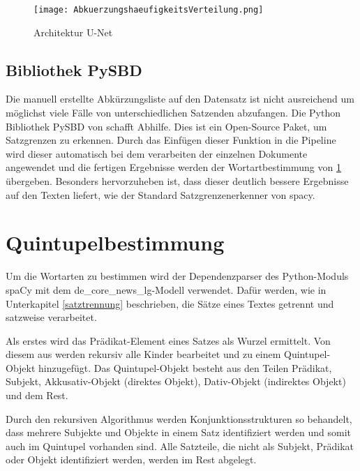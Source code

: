 \begin{figure}[h]
	\centering
	\texttt{[image: AbkuerzungshaeufigkeitsVerteilung.png]}
	\caption{Architektur U-Net}
	\label{fig:AbkuerzungshaeufigkeitsVerteilung}
\end{figure}

\subsection{Bibliothek PySBD}
Die manuell erstellte Abkürzungsliste auf den Datensatz ist nicht ausreichend um möglichst viele Fälle von unterschiedlichen Satzenden abzufangen. Die Python Bibliothek PySBD von \cite{sadvilkar-neumann-2020-pysbd} schafft Abhilfe. Dies ist ein Open-Source Paket, um Satzgrenzen zu erkennen. Durch das Einfügen dieser Funktion in die Pipeline wird dieser automatisch bei dem verarbeiten der einzelnen Dokumente angewendet und die fertigen Ergebnisse werden der Wortartbestimmung von \ref{quintupelbestimmung} übergeben. Besonders hervorzuheben ist, dass dieser deutlich bessere Ergebnisse auf den Texten liefert, wie der Standard Satzgrenzenerkenner von spacy.

\section{Quintupelbestimmung}\label{quintupelbestimmung}
Um die Wortarten zu bestimmen wird der Dependenzparser des Python-Moduls spaCy mit dem \glqq de_core_news_lg\grqq{}-Modell verwendet. Dafür werden, wie in Unterkapitel \ref{satztrennung} beschrieben, die Sätze eines Textes getrennt und satzweise verarbeitet.

Als erstes wird das Prädikat-Element eines Satzes als Wurzel ermittelt. Von diesem aus werden rekursiv alle Kinder bearbeitet und zu einem Quintupel-Objekt hinzugefügt. Das Quintupel-Objekt besteht aus den Teilen Prädikat, Subjekt, Akkusativ-Objekt (direktes Objekt), Dativ-Objekt (indirektes Objekt) und dem \glqq Rest\grqq{}.

Durch den rekursiven Algorithmus  werden Konjunktionsstrukturen so behandelt, dass mehrere Subjekte und Objekte in einem Satz identifiziert werden und somit auch im Quintupel vorhanden sind. Alle Satzteile, die nicht als Subjekt, Prädikat oder Objekt identifiziert werden, werden im Rest abgelegt.

